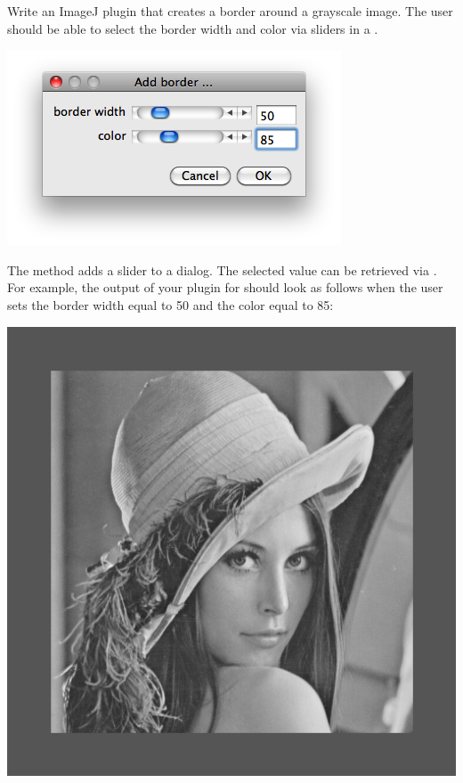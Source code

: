 \documentclass{book}
\begin{document}
\begin{exercise}
Write an ImageJ plugin that creates a border around a grayscale image. The user should be able to select the border width and color via sliders in a . 

\begin{center}
\includegraphics[scale=0.5]{sliders.png}
\end{center}

The method  adds a slider to a dialog. The selected value can be retrieved via . For example, the output of your plugin for  should look as follows when the user sets the border width equal to 50 and the color equal to 85:
 
\begin{center}
\includegraphics[scale=0.2]{lena-border.png}
\end{center}
\end{exercise}
\end{document}
